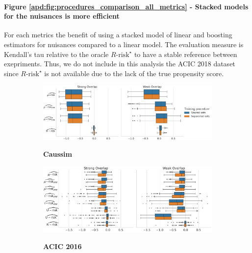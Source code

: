 \documentclass[a4paper,num-refs]{oup-contemporary}%
\begin{document}
\paragraph{Figure \ref{apd:fig:procedures_comparison_all_metrics} - Stacked models for the nuisances is more efficient}
For each metrics the benefit of
using a stacked model of linear and boosting estimators for nuisances compared
to a linear model. The evaluation measure is Kendall's tau relative to the
oracle $R\text{-risk}^{\star}$ to have a stable reference between exepriments.
Thus, we do not include in this analysis the ACIC 2018 dataset since
$R\text{-risk}^{\star}$ is not available due to the lack of the true propensity
score.

\begin{figure}
    \begin{subfigure}[b]{0.9\textwidth}
        \caption{\textbf{Caussim}}
        \includegraphics[width=1.15\textwidth]{_3_procedure_Caussim_N5000__ref_metric_oracle_r_risk.pdf}
        \label{fig:experiments:procedures_comparison:caussim}
    \end{subfigure}
    \hfill
    \begin{subfigure}[b]{0.9\textwidth}
        \centering
        \caption{\textbf{ACIC 2016}}
        \includegraphics[width=1\textwidth]{_3_procedure_ACIC2016_N4802__ref_oracle_r_risk.pdf}
        \label{fig:experiments:procedures_comparison:acic_2016}
    \end{subfigure}
    \hfill
    \begin{subfigure}[b]{0.9\textwidth}

\end{subfigure}
\end{figure}
\end{document}
